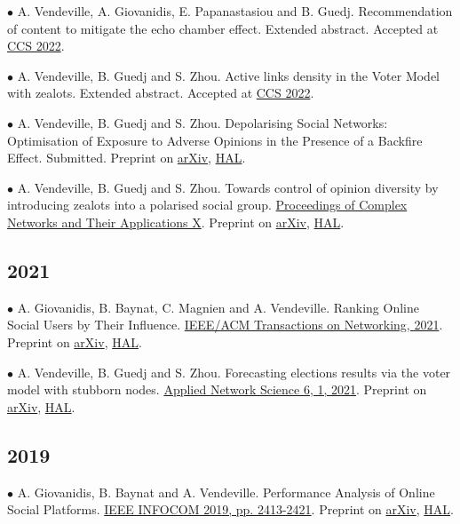 \documentclass[a4paper,10pt]{article}
\begin{document}
$\bullet$ A. Vendeville, A. Giovanidis, E. Papanastasiou and B. Guedj. Recommendation of content to mitigate the echo chamber effect. Extended abstract. Accepted at \href{https://www.ccs2022.org/}{CCS 2022}.

$\bullet$ A. Vendeville, B. Guedj and S. Zhou. Active links density in the Voter Model with zealots. Extended abstract. Accepted at \href{https://www.ccs2022.org/}{CCS 2022}.

$\bullet$ A. Vendeville, B. Guedj and S. Zhou. Depolarising Social Networks: Optimisation of Exposure to Adverse Opinions in the Presence of a Backfire Effect. Submitted. Preprint on \href{https://arxiv.org/abs/2203.02002}{arXiv}, \href{https://hal.inria.fr/hal-03600429}{HAL}.

$\bullet$ A. Vendeville, B. Guedj and S. Zhou. Towards control of opinion diversity by introducing zealots into a polarised social group. \href{https://link.springer.com/chapter/10.1007\%2F978-3-030-93413-2_29}{Proceedings of Complex Networks and Their Applications X}. Preprint on \href{https://arxiv.org/abs/2006.07265}{arXiv}, \href{https://hal.inria.fr/hal-02872161}{HAL}.

\subsection*{2021}
$\bullet$ A. Giovanidis, B. Baynat, C. Magnien and A. Vendeville. Ranking Online Social Users by Their Influence. \href{https://doi.org/10.1109/TNET.2021.3085201}{IEEE/ACM Transactions on Networking, 2021}. Preprint on \href{https://arxiv.org/abs/2107.01914}{arXiv}, \href{https://hal.archives-ouvertes.fr/hal-02970215}{HAL}.

$\bullet$ A. Vendeville, B. Guedj and S. Zhou. Forecasting elections results via the voter model with stubborn nodes. \href{https://doi.org/10.1007/s41109-020-00342-7}{Applied Network Science 6, 1, 2021}. Preprint on \href{https://arxiv.org/abs/2009.10627}{arXiv}, \href{https://hal.archives-ouvertes.fr/hal-02946434}{HAL}.

\subsection*{2019}
$\bullet$ A. Giovanidis, B. Baynat and A. Vendeville. Performance Analysis of Online Social Platforms. \href{https://ieeexplore.ieee.org/abstract/document/8737539}{IEEE INFOCOM 2019, pp. 2413-2421}. Preprint on \href{https://arxiv.org/abs/1902.07187}{arXiv}, \href{https://hal.archives-ouvertes.fr/hal-01941296}{HAL}.
\end{document}
